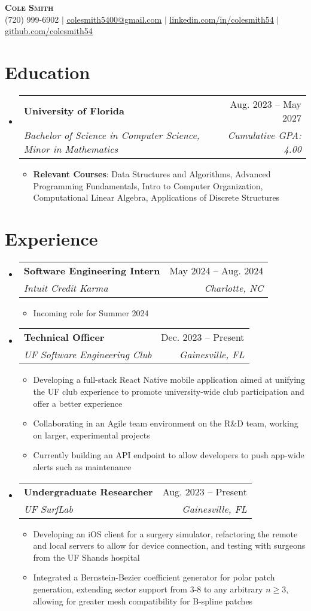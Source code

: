 \documentclass[letterpaper,12pt]{article}
\makeatletter
\newcommand{\resumeItem}[1]{
  \item\small{
    {#1 \vspace{-2pt}}
  }
}
\newcommand{\resumeSubheading}[4]{
  \vspace{-2pt}\item
    \begin{tabular*}{0.97\textwidth}[t]{l@{\extracolsep{\fill}}r}
      \textbf{#1} & #2 \\
      \textit{\small#3} & \textit{\small #4} \\
    \end{tabular*}\vspace{-7pt}
}
\newcommand{\resumeSubHeadingListStart}{\begin{itemize}[leftmargin=0.15in, label={}]}
\newcommand{\resumeSubHeadingListEnd}{\end{itemize}}
\newcommand{\resumeItemListStart}{\begin{itemize}}
\newcommand{\resumeItemListEnd}{\end{itemize}\vspace{-5pt}}
\makeatother
\begin{document}
\begin{center}
    \textbf{\Huge \scshape Cole Smith} \\ \vspace{1pt}
    \small (720) 999-6902 $|$ \href{mailto:colesmith5400@gmail.com}{\underline{colesmith5400@gmail.com}} $|$ 
    \href{https://linkedin.com/in/colesmith54}{\underline{linkedin.com/in/colesmith54}} $|$
    \href{https://github.com/colesmith54}{\underline{github.com/colesmith54}}
\end{center}


\section{Education}
  \resumeSubHeadingListStart
    \resumeSubheading
      {University of Florida}{Aug. 2023 -- May 2027}
      {Bachelor of Science in Computer Science, Minor in Mathematics}{Cumulative GPA: 4.00}
      \resumeItemListStart
        \resumeItem{\textbf{Relevant Courses}: Data Structures and Algorithms, Advanced Programming Fundamentals, Intro to Computer Organization, Computational Linear Algebra, Applications of Discrete Structures}
      \resumeItemListEnd
  \resumeSubHeadingListEnd


\section{Experience}
  \resumeSubHeadingListStart
      \resumeSubheading
      {Software Engineering Intern}{May 2024 -- Aug. 2024}
      {Intuit Credit Karma}{Charlotte, NC}
      \resumeItemListStart
        \resumeItem{Incoming role for Summer 2024}
      \resumeItemListEnd
      \resumeSubheading
      {Technical Officer}{Dec. 2023 -- Present}
      {UF Software Engineering Club}{Gainesville, FL}
      \resumeItemListStart
        \resumeItem{Developing a full-stack React Native mobile application aimed at unifying the UF club experience to promote university-wide club participation and offer a better experience}
        \resumeItem{Collaborating in an Agile team environment on the R\&D team, working on larger, experimental projects}
        \resumeItem{Currently building an API endpoint to allow developers to push app-wide alerts such as maintenance}
      \resumeItemListEnd
    \resumeSubheading
      {Undergraduate Researcher}{Aug. 2023 -- Present}
      {UF SurfLab}{Gainesville, FL}
      \resumeItemListStart
        \resumeItem{Developing an iOS client for a surgery simulator, refactoring the remote and local servers to allow for device connection, and testing with surgeons from the UF Shands hospital}
        \resumeItem{Integrated a Bernstein-Bezier coefficient generator for polar patch generation, extending sector support from 3-8 to any arbitrary $n \geq 3$, allowing for greater mesh compatibility for B-spline patches }
      \resumeItemListEnd
  \resumeSubHeadingListEnd
\end{document}
